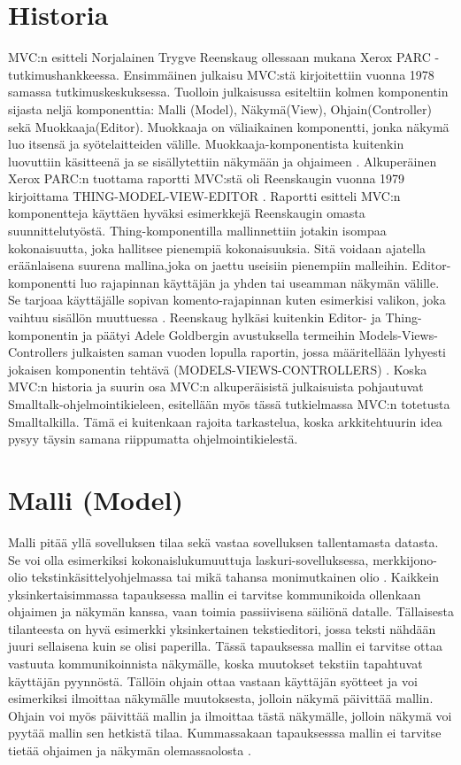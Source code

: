 \documentclass[utf8]{gradu3}
\begin{document}
\section{Historia}
MVC:n esitteli Norjalainen Trygve Reenskaug ollessaan mukana Xerox PARC -tutkimushankkeessa. 
Ensimmäinen julkaisu MVC:stä kirjoitettiin vuonna 1978 samassa tutkimuskeskuksessa. 
Tuolloin julkaisussa esiteltiin kolmen komponentin sijasta neljä komponenttia: 
Malli (Model), Näkymä(View), Ohjain(Controller) sekä Muokkaaja(Editor). Muokkaaja on 
väliaikainen komponentti, jonka näkymä luo itsensä ja syötelaitteiden välille. 
Muokkaaja-komponentista kuitenkin luovuttiin käsitteenä ja se sisällytettiin näkymään 
ja ohjaimeen \parencite{xerox}. Alkuperäinen Xerox PARC:n tuottama raportti MVC:stä oli Reenskaugin 
vuonna 1979 kirjoittama THING-MODEL-VIEW-EDITOR \parencite{xerox-thing}. Raportti esitteli MVC:n 
komponentteja käyttäen hyväksi esimerkkejä Reenskaugin omasta suunnittelutyöstä. Thing-komponentilla mallinnettiin
jotakin isompaa kokonaisuutta, joka hallitsee pienempiä kokonaisuuksia. Sitä voidaan ajatella eräänlaisena suurena mallina,joka on jaettu useisiin pienempiin malleihin. Editor-komponentti luo rajapinnan käyttäjän ja yhden tai useamman näkymän välille. Se tarjoaa käyttäjälle sopivan komento-rajapinnan kuten esimerkisi valikon, joka vaihtuu sisällön muuttuessa \parencite{xerox-thing}. Reenskaug hylkäsi kuitenkin Editor- ja Thing-komponentin ja  päätyi Adele Goldbergin avustuksella termeihin Models-Views-Controllers julkaisten saman vuoden lopulla raportin, jossa määritellään lyhyesti jokaisen komponentin tehtävä (MODELS-VIEWS-CONTROLLERS) \parencite{xerox-original}. Koska MVC:n historia ja suurin osa MVC:n alkuperäisistä julkaisuista pohjautuvat Smalltalk-ohjelmointikieleen, esitellään myös tässä tutkielmassa MVC:n totetusta Smalltalkilla.
Tämä ei kuitenkaan rajoita tarkastelua, koska arkkitehtuurin idea pysyy täysin samana riippumatta ohjelmointikielestä.

\section{Malli (Model)}
Malli pitää yllä sovelluksen tilaa sekä vastaa sovelluksen tallentamasta datasta. Se voi olla esimerkiksi kokonaislukumuuttuja laskuri-sovelluksessa, merkkijono-olio tekstinkäsittelyohjelmassa tai
mikä tahansa monimutkainen olio \parencite[s. 3]{krasner_desc}. Kaikkein yksinkertaisimmassa tapauksessa mallin ei tarvitse kommunikoida ollenkaan ohjaimen ja näkymän kanssa, vaan toimia passiivisena säiliönä datalle.
Tällaisesta tilanteesta on hyvä esimerkki yksinkertainen tekstieditori, jossa teksti nähdään juuri sellaisena kuin se olisi paperilla. Tässä tapauksessa mallin ei tarvitse ottaa vastuuta
kommunikoinnista näkymälle, koska muutokset tekstiin tapahtuvat käyttäjän pyynnöstä. Tällöin ohjain ottaa vastaan käyttäjän syötteet ja voi esimerkiksi ilmoittaa näkymälle muutoksesta, jolloin näkymä
päivittää mallin. Ohjain voi myös päivittää mallin ja ilmoittaa tästä näkymälle, jolloin näkymä voi pyytää mallin sen hetkistä tilaa. Kummassakaan tapauksesssa mallin ei tarvitse tietää ohjaimen ja näkymän
olemassaolosta \parencite{burbeck}.
\end{document}
